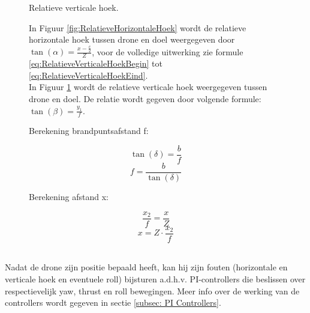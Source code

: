 \begin{figure}[h]
\begin{minipage}{.45\textwidth}
		\caption{Relatieve verticale hoek.}
		\label{fig:RelatieveVerticaleHoek}
	\end{minipage}%
	\caption*{In Figuur \ref{fig:RelatieveHorizontaleHoek} wordt de relatieve horizontale hoek tussen drone en doel weergegeven door \(\tan(\alpha) = \frac{x-\frac{c}{2}}{Z}\), voor de volledige uitwerking zie formule \ref{eq:RelatieveVerticaleHoekBegin} tot \ref{eq:RelatieveVerticaleHoekEind}.\\
		In Figuur \ref{fig:RelatieveVerticaleHoek} wordt de relatieve verticale hoek weergegeven tussen drone en doel. De relatie wordt gegeven door volgende formule: \(\tan(\beta) = \frac{y_1}{f}\).}
\end{figure}
\begin{figure}[h]
	\centering
	\begin{minipage}{.45\textwidth}
	\begin{center}
			Berekening brandpuntsafstand f:
	\end{center}
		\begin{equation} \label{eq:RelatieveVerticaleHoekBegin}
		\tan(\delta) = \frac{b}{f}
		\end{equation}
		\begin{equation} 
		f = \frac{b}{\tan(\delta)}
		\end{equation}
	\end{minipage}
	\begin{minipage}{.45\textwidth}
		\begin{center}
			Berekening afstand x:
		\end{center}
		\begin{equation} 
		\frac{x_2}{f} = \frac{x}{Z}
		\end{equation}
		\begin{equation} \label{eq:RelatieveVerticaleHoekEind}
		x = Z \cdot \frac{x_2}{f}	
		\end{equation}
	\end{minipage}%
\end{figure}
\\
Nadat de drone zijn positie bepaald heeft, kan hij zijn fouten (horizontale en verticale hoek en eventuele roll) bijsturen a.d.h.v. PI-controllers die beslissen over respectievelijk yaw, thrust en roll bewegingen. Meer info over de werking van de controllers wordt gegeven in sectie \ref{subsec: PI Controllers}. 
\\
\\
